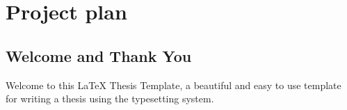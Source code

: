 
\chapter{Project plan} %

\label{Chapter3} %



\section{Welcome and Thank You}

Welcome to this \LaTeX{} Thesis Template, a beautiful and easy to use template for writing a thesis using the typesetting system.